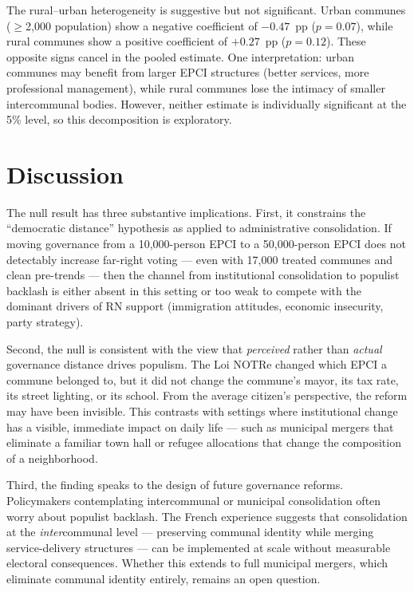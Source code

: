 \documentclass[12pt]{article}
\begin{document}
The rural--urban heterogeneity is suggestive but not significant. Urban communes ($\geq$2,000 population) show a negative coefficient of $-0.47$~pp ($p = 0.07$), while rural communes show a positive coefficient of $+0.27$~pp ($p = 0.12$). These opposite signs cancel in the pooled estimate. One interpretation: urban communes may benefit from larger EPCI structures (better services, more professional management), while rural communes lose the intimacy of smaller intercommunal bodies. However, neither estimate is individually significant at the 5\% level, so this decomposition is exploratory.

\section{Discussion}

The null result has three substantive implications. First, it constrains the ``democratic distance'' hypothesis as applied to administrative consolidation. If moving governance from a 10,000-person EPCI to a 50,000-person EPCI does not detectably increase far-right voting --- even with 17,000 treated communes and clean pre-trends --- then the channel from institutional consolidation to populist backlash is either absent in this setting or too weak to compete with the dominant drivers of RN support (immigration attitudes, economic insecurity, party strategy).

Second, the null is consistent with the view that \textit{perceived} rather than \textit{actual} governance distance drives populism. The Loi NOTRe changed which EPCI a commune belonged to, but it did not change the commune's mayor, its tax rate, its street lighting, or its school. From the average citizen's perspective, the reform may have been invisible. This contrasts with settings where institutional change has a visible, immediate impact on daily life --- such as municipal mergers that eliminate a familiar town hall or refugee allocations that change the composition of a neighborhood.

Third, the finding speaks to the design of future governance reforms. Policymakers contemplating intercommunal or municipal consolidation often worry about populist backlash. The French experience suggests that consolidation at the \textit{inter}communal level --- preserving communal identity while merging service-delivery structures --- can be implemented at scale without measurable electoral consequences. Whether this extends to full municipal mergers, which eliminate communal identity entirely, remains an open question.
\end{document}
